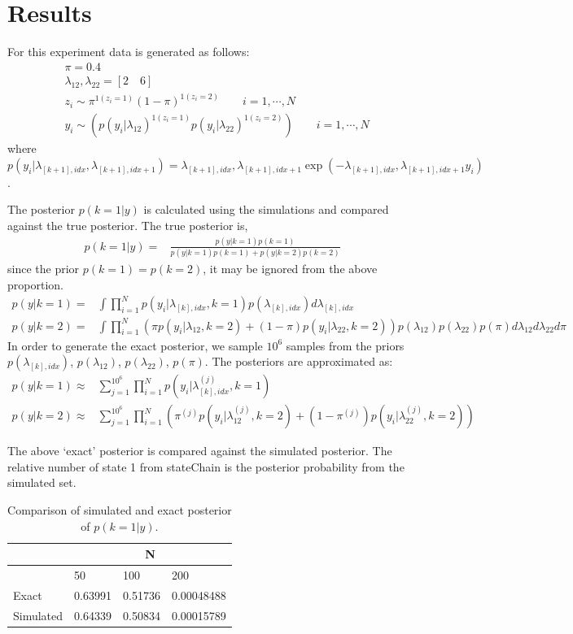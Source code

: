 \documentclass{article}
\begin{document}
\clearpage
\section{Results}
For this experiment data is generated as follows:
\begin{align*}
& \pi =  0.4 \\
& \lambda_{12},\lambda_{22} =  [2\quad 6] \\
& z_i \sim \pi^{1(z_i=1)}(1-\pi)^{1(z_i=2)}\qquad i=1,\cdots,N\\
& y_i \sim (p(y_i|\lambda_{12})^{1(z_i=1)}p(y_i|\lambda_{22})^{1(z_i=2)})\qquad i=1,\cdots,N
\end{align*}
where $p(y_i|\lambda_{[k+1],idx},\lambda_{[k+1],idx+1})=\lambda_{[k+1],idx},\lambda_{[k+1],idx+1}\exp(-\lambda_{[k+1],idx},\lambda_{[k+1],idx+1}y_i)$.

The posterior $p(k=1|y)$ is calculated using the simulations and compared against the true posterior. The true posterior is,
\begin{align}
p(k=1|y)=&\frac{p(y|k=1)p(k=1)}{p(y|k=1)p(k=1)+p(y|k=2)p(k=2)}
\end{align}
since the prior $p(k=1)=p(k=2)$, it may be ignored from the above proportion.
\begin{align*}
p(y|k=1)=& \int \prod_{i=1}^{N}p(y_i|\lambda_{[k],idx},k=1)p(\lambda_{[k],idx}) d\lambda_{[k],idx}\\
p(y|k=2)=& \int \prod_{i=1}^{N}\left(\pi p(y_i|\lambda_{12},k=2)+(1-\pi)p(y_i|\lambda_{22},k=2)\right)p(\lambda_{12})p(\lambda_{22})p(\pi) d\lambda_{12}d\lambda_{22}d\pi
\end{align*}
In order to generate the exact posterior, we sample $10^6$ samples from the priors $p(\lambda_{[k],idx})$, $p(\lambda_{12})$, $p(\lambda_{22})$, $p(\pi)$. The posteriors are approximated as:
\begin{align}
p(y|k=1)\approx &\sum_{j=1}^{10^6}\prod_{i=1}^{N}p(y_i|\lambda_{[k],idx}^{(j)},k=1)\\
p(y|k=2)\approx & \sum_{j=1}^{10^6} \prod_{i=1}^{N}\left(\pi^{(j)} p(y_i|\lambda_{12}^{(j)},k=2)+(1-\pi^{(j)})p(y_i|\lambda_{22}^{(j)},k=2)\right)
\end{align}

The above `exact' posterior is compared against the simulated posterior. The relative number of state 1 from stateChain is the posterior probability from the simulated set.

\begin{table}[h]
\centering
\begin{tabular}{llll}
\hline
& \multicolumn{3}{c}{N}\\
\hline
& 50 & 100 & 200 \\
\hline
Exact & 0.63991 & 0.51736 & 0.00048488\\
Simulated & 0.64339 & 0.50834 & 0.00015789\\
\hline
\end{tabular}
\caption{Comparison of simulated and exact posterior of $p(k=1|y)$.}
\end{table}
\end{document}
